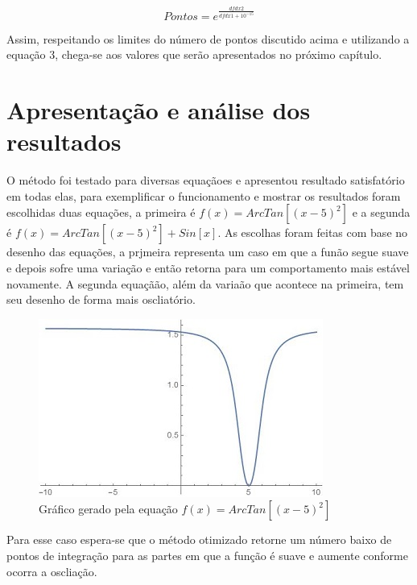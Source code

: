 \documentclass[12pt,a4paper]{article}
\begin{document}
\begin{equation}
Pontos = e^{\frac{dfdx2}{dfdx1+10^{-15}}}
\end{equation}

Assim, respeitando os limites do número de pontos discutido acima e utilizando a equação 3, chega-se aos valores que serão apresentados no próximo capítulo.


\newpage
\section{Apresentação e análise dos resultados}

\qquad O método foi testado para diversas equaçãoes e apresentou resultado satisfatório em todas elas, para exemplificar o funcionamento e mostrar os resultados foram escolhidas duas equações, a primeira é $f(x)=ArcTan[(x-5)^{2}]$ e a segunda é $f(x)=ArcTan[(x-5)^{2}]+Sin[x]$. As escolhas foram feitas com base no desenho das equações, a prjmeira representa um caso em que a funão segue suave e depois sofre uma variação e então retorna para um comportamento mais estável novamente. A segunda equaçãão, além da variaão que acontece na primeira, tem seu desenho de forma mais oscliatório.

\begin{figure}[h]
\begin{center}
\includegraphics{images/arctangraph}
\caption{Gráfico gerado pela equação $f(x)=ArcTan[(x-5)^{2}]$}
\end{center}
\end{figure}

Para esse caso espera-se que o método otimizado retorne um número baixo de pontos de integração para as partes em que a função é suave e aumente conforme ocorra a oscliação.

\newpage
\end{document}
